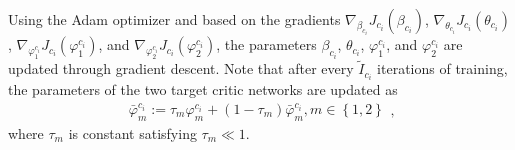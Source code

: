 \documentclass[lettersize,journal,onecolumn]{IEEEtran}
\begin{document}
Using the Adam optimizer and based on the gradients ${{\nabla }_{{{\beta }_{{{c}_{i}}}}}}{{J}_{{{c}_{i}}}}\left( {{\beta }_{{{c}_{i}}}} \right)$, ${{\nabla }_{{{\theta }_{{{c}_{i}}}}}}{{J}_{{{c}_{i}}}}({{\theta }_{{{c}_{i}}}})$, ${{\nabla }_{\varphi _{1}^{{{c}_{i}}}}}{{J}_{{{c}_{i}}}}\left( \varphi _{1}^{{{c}_{i}}} \right)$, and ${{\nabla }_{\varphi _{2}^{{{c}_{i}}}}}{{J}_{{{c}_{i}}}}\left( \varphi _{2}^{{{c}_{i}}} \right)$, the parameters ${{\beta }_{{{c}_{i}}}}$, ${{\theta }_{{{c}_{i}}}}$, $\varphi _{1}^{{{c}_{i}}}$, and $\varphi _{2}^{{{c}_{i}}}$ are updated through gradient descent. Note that after every ${{\tilde{I}}_{{{c}_{i}}}}$ iterations of training, the parameters of the two target critic networks are updated as
\begin{equation}
\begin{aligned}
\bar{\varphi }_{m}^{{{c}_{i}}}:={{\tau }_{m}}\varphi _{m}^{{{c}_{i}}}+\left( 1-{{\tau }_{m}} \right)\bar{\varphi }_{m}^{{{c}_{i}}}, m \in \left\{ 1,2\right\} 
\end{aligned}
\label{eq34},	
\end{equation}
where ${{\tau }_{m}}$ is constant satisfying ${{\tau }_{m}}\ll 1$. 
\end{document}

